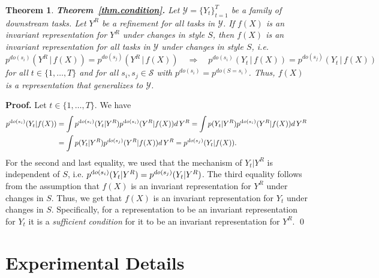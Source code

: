 \documentclass{article}
\newcommand{\feat}{f}
\newtheorem{theorem*}{Theorem}
\newenvironment{oneshot}[1]{\begin{theorem*}{#1}{\unskip}}{\end{theorem*}}
\begin{document}
\begin{oneshot}{\bf Theorem~\ref{thm.condition}.}
    Let $\mathcal{Y}=\{Y_t\}_{t=1}^{T}$ be a family of downstream tasks. Let $Y^{R}$ be a refinement for all tasks in $\mathcal{Y}$. 
    If $\feat(X)$ is an invariant representation for $Y^{R}$ under changes in style $S$, then $\feat(X)$ is an invariant representation for all tasks in $\mathcal{Y}$ under changes in style $S$, i.e.
    \begin{equation}
    p^{do(s_{i})}(Y^{R}\,\vert\,\feat(X)) = p^{do(s_{j})}(Y^{R}\,\vert\,\feat(X)) \quad 
    \Rightarrow \quad 
    p^{do(s_{i})}(Y_{t}\,\vert\,\feat(X)) = p^{do(s_{j})}(Y_{t}\,\vert\,\feat(X))
    \end{equation}
    for all $ t \in\{1, \dots, T\}$ and for all $s_{i}, s_{j}\in\mathcal{S}$ with $p^{do(s_{i})}=p^{do(S = s_{i})}$. 
Thus, $\feat(X)$ is a representation that generalizes to $\mathcal{Y}$.
\end{oneshot}


{\bf Proof.}
Let $t \in\{1, \dots, T\}$. We have
\begin{align*}
   p^{\text do(s_{i})}(Y_t \vert f(X)) 
   & = \int p^{\text do(s_{i})}(Y_t \vert Y^{R}) p^{\text do(s_{i})}(Y^{R}\vert f(X)) d\,Y^{R}
    = \int p(Y_t \vert Y^{R}) p^{\text do(s_{i})}(Y^{R}\vert f(X)) d\,Y^{R} \\
   & = \int p(Y_t \vert Y^{R}) p^{do(s_{j})}(Y^{R}\vert f(X)) d\,Y^{R} 
   = p^{do(s_{j})}(Y_t \vert f(X)).
\end{align*}
For the second and last equality, we used that the mechanism of $Y_t\vert Y^{R}$ is independent of $S$, i.e. $p^{\text do(s_{i})}(Y_t \vert Y^{R}) = p^{do(s_{j})}(Y_t \vert Y^{R})$. 
The third equality follows from the assumption that $\feat(X)$ is an invariant representation for $Y^{R}$ under changes in $S$. 
Thus, we get that $\feat(X)$ is an invariant representation for $Y_t$ under changes in $S$. Specifically, for a representation to be an invariant representation for $Y_t$ it is a \emph{sufficient condition} for it to be an invariant representation for $Y^{R}$. \qed \section{Experimental Details} \label{sec:experiments_app}
\end{document}
